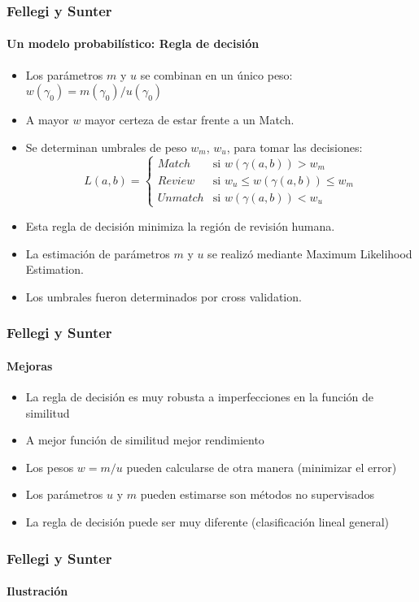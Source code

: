 \documentclass{beamer}
\begin{document}
\begin{frame}
	\frametitle{Fellegi y Sunter}
	\framesubtitle{Un modelo probabilístico: Regla de decisión}
	  \begin{itemize}
      \item Los parámetros $m$ y $u$ se combinan en un único peso:
      $w(\gamma_0) = m(\gamma_0)/u(\gamma_0)$
      \item A mayor $w$ mayor certeza de estar frente a un Match.
      \item Se determinan umbrales de peso $w_m$, $w_u$, para tomar las decisiones:
      $$
L(a,b) =
\begin{cases}
Match & \text{si }w(\gamma(a,b))>w_m \\
Review & \text{si }w_u\leq w(\gamma(a,b))\leq w_m \\
Unmatch & \text{si }w(\gamma(a,b))<w_u
\end{cases}
$$
\item Esta regla de decisión minimiza la región de revisión humana.
\item La estimación de parámetros $m$ y $u$ se realizó mediante Maximum Likelihood Estimation.
\item Los umbrales fueron determinados por cross validation.
    \end{itemize} 
\end{frame}

\begin{frame}
	\frametitle{Fellegi y Sunter}
	\framesubtitle{Mejoras}
	  \begin{itemize}
      \item La regla de decisión es muy robusta a imperfecciones en la función de similitud
      \item A mejor función de similitud mejor rendimiento 
      \item Los pesos $w=m/u$ pueden calcularse de otra manera (minimizar el error)
      \item Los parámetros $u$ y $m$ pueden estimarse son métodos no supervisados
      \item La regla de decisión puede ser muy diferente (clasificación lineal general)
          \end{itemize} 
\end{frame}

\begin{frame}
	\frametitle{Fellegi y Sunter}
	\framesubtitle{Ilustración}
	\begin{center}
\end{center}
\end{frame}
\end{document}

